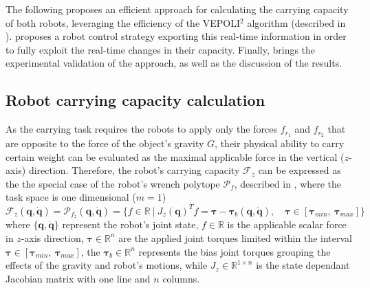 The following  proposes an efficient approach for calculating the carrying capacity of both robots, leveraging the efficiency of the VEPOLI$^2$ algorithm (described in ).  proposes a robot control strategy exporting this real-time information in order to fully exploit the real-time changes in their capacity. Finally,  brings the experimental validation of the approach, as well as the discussion of the results. 

\subsection{Robot carrying capacity calculation}
\label{sec:robot_carrying_capacity}


As the carrying task requires the robots to apply only the forces $f_{r_1}$ and $f_{r_2}$ that are opposite to the force of the object's gravity $G$, their physical ability to carry certain weight can be evaluated as the maximal applicable force in the vertical ($z$-axis) direction. Therefore, the robot's carrying capacity $\mathcal{F}_z$ can be expressed as the the special case of the robot's wrench polytope $\mathcal{P}_{f}$, described in , where the task space is one dimensional ($m=1$)
\begin{equation}
    \mathcal{F}_z (\bm{q},\dot{\bm{q}}) = \mathcal{P}_{f_z} (\bm{q},\dot{\bm{q}}) = \{ f \in \mathbb{R} ~|~ J_{z}(\bm{q})^Tf=\bm{\tau} - \bm{\tau}_b(\bm{q},\dot{\bm{q}}), \quad \bm{\tau}\in[\bm{\tau}_{min}, ~\bm{\tau}_{max}]\}
\end{equation}
where $\{\bm{q},\dot{\bm{q}}\}$ represent the robot's joint state, $f \in\mathbb{R}$ is the applicable scalar force in $z$-axis direction, $\bm{\tau}\in\mathbb{R}^n$ are the applied joint torques limited within the interval $\bm{\tau}\in[\bm{\tau}_{min}, ~\bm{\tau}_{max}]$, the $\bm{\tau}_{b}\in\mathbb{R}^n$ represents the bias joint torques grouping the effects of the gravity and robot's motions, while $J_{z}\in\mathbb{R}^{1\times n}$ is the state dependant Jacobian matrix with one line and $n$ columns.

